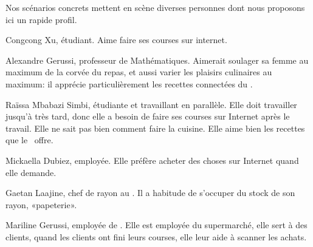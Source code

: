 Nos scénarios concrets mettent en scène diverses personnes dont nous proposons ici un rapide profil.
\blank[big]

Congcong Xu, étudiant.\crlf
Aime faire ses courses sur internet.
\stopfiguretext

Alexandre Gerussi, professeur de Mathématiques.\crlf
Aimerait soulager sa femme au maximum de la corvée du repas, et aussi varier les plaisirs culinaires au maximum: il apprécie particulièrement les recettes connectées du \fm.
\stopfiguretext

Raïssa Mbabazi Simbi, étudiante et travaillant en parallèle.\crlf
Elle doit travailler jusqu'à très tard, donc elle a besoin de faire ses courses sur Internet après le travail. 
Elle ne sait pas bien comment faire la cuisine.
Elle aime bien les recettes que le \fm\ offre.
\stopfiguretext

Mickaella Dubiez, employée.\crlf
Elle préfère acheter des choses sur Internet quand elle demande.
\stopfiguretext

Gaetan Laajine, chef de rayon au \fm.\crlf
Il a habitude de s'occuper du stock de son rayon, «papeterie».
\stopfiguretext

Mariline Gerussi, employée de \fm.\crlf
Elle est employée du supermarché, elle sert à des clients, quand les clients ont fini leurs courses, elle leur aide à scanner les achats.
\stopfiguretext
